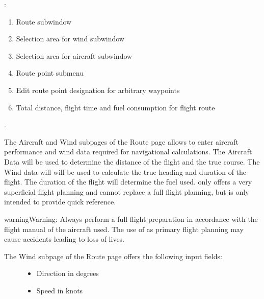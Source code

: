 \documentclass[letterpaper,10pt,english]{sphinxmanual}
\begin{document}
\sphinxAtStartPar
{}:
\begin{enumerate}
%
\item {} 
\sphinxAtStartPar
Route sub\sphinxhyphen{}window

\item {} 
\sphinxAtStartPar
Selection area for wind sub\sphinxhyphen{}window

\item {} 
\sphinxAtStartPar
Selection area for aircraft sub\sphinxhyphen{}window

\item {} 
\sphinxAtStartPar
Route point sub\sphinxhyphen{}menu

\item {} 
\sphinxAtStartPar
Edit route point designation for arbitrary waypoints

\item {} 
\sphinxAtStartPar
Total distance, flight time and fuel consumption for flight route

\end{enumerate}

\sphinxAtStartPar
.

\sphinxAtStartPar
{}

\sphinxAtStartPar
The Aircraft and Wind sub\sphinxhyphen{}pages of the Route page allows to enter aircraft
performance and wind data required for navigational calculations.  The Aircraft
Data will be used to determine the distance of the flight and the true course.
The Wind data will will be used to calculate the true heading and duration of
the flight. The duration of the flight will determine the fuel used.   only offers a very superficial flight planning and cannot
replace a full flight planning, but is only intended to provide quick reference.

\begin{sphinxadmonition}{warning}{Warning:}
\sphinxAtStartPar
Always perform a full flight preparation in accordance with the flight
manual of the aircraft used. The use of 
as primary flight planning may cause accidents leading to loss of
lives.
\end{sphinxadmonition}
\begin{description}
\item[{The Wind sub\sphinxhyphen{}page of the Route page offers the following input fields:}] \leavevmode\begin{itemize}
\item {} 
\sphinxAtStartPar
Direction in degrees

\item {} 
\sphinxAtStartPar
Speed in knots

\end{itemize}

\end{description}
\end{document}
